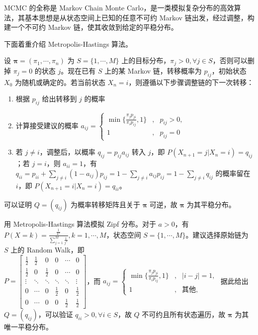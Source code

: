 \documentclass[../main.tex]{subfiles}
\begin{document}
MCMC 的全称是 Markov Chain Monte Carlo，是一类模拟复杂分布的高效算法，其基本思想是从状态空间上已知的任意不可约 Markov 链出发，经过调整，构建一个不可约 Markov 链，使其收敛到给定的平稳分布。

下面着重介绍 Metropolis-Hastings 算法。

设 $\boldsymbol\pi=(\pi_1,\cdots,\pi_n)$ 为 $S=\{1,\cdots,M\}$ 上的目标分布，$\pi_j>0,\forall j\in S$，否则可以删掉 $\pi_j=0$ 的状态 $j$。现在已有 $S$ 上的某 Markov 链，转移概率为 $p_{ij}$，初始状态 $X_0$ 为随机或确定的。若当前状态 $X_n=i$，则遵循以下步骤调整链的下一次转移：
\begin{enumerate}
    \item 根据 $p_{ij}$ 给出转移到 $j$ 的概率
    \item 计算接受建议的概率 $a_{ij}=
              \left\{\begin{aligned}
                  \min\{\frac{\pi_jp_{ji}}{\pi_ip_{ij}},1\} & , & p_{ij}>0, \\
                  1                                         & , & p_{ij}=0
              \end{aligned}\right.$
    \item 若 $j\neq i$，调整后，以概率 $q_{ij}=p_{ij}a_{ij}$ 转入 $j$，即 $P(X_{n+1}=j|X_n=i)=q_{ij}$；若 $j=i$，则 $a_{ii}=1$，有 $q_{ii}=p_{ii}+\sum_{j\neq i}(1-a_{ij})p_{ij}=1-\sum_{j\neq i}a_{ij}p_{ij}=1-\sum_{j\neq i}q_{ij}$ 的概率留在 $i$，即 $P(X_{n+1}=i|X_n=i)=q_{ii}$。
\end{enumerate}
可以证明 $Q=(q_{ij})$ 为概率转移矩阵且关于 $\boldsymbol\pi$ 可逆，故 $\boldsymbol\pi$ 为其平稳分布。

\begin{example}
    用 Metropolis-Hastings 算法模拟 Zipf 分布。对于 $a>0$，有 $P(X=k)=\frac{\frac1{k^a}}{\sum_{j=1}^M\frac1{j^a}},k=1,\cdots,M$，状态空间 $S=\{1,\cdots,M\}$。建议选择原始链为 $S$ 上的 Random Walk，即\\
    $P=\left[\begin{matrix}
                \frac12 & \frac12 & 0       & 0       & \cdots  & 0       \\
                \frac12 & 0       & \frac12 & 0       & \cdots  & 0       \\
                \vdots  & \ddots  & \ddots  & \ddots  & \ddots  & \vdots  \\
                0       & \cdots  & 0       & \frac12 & 0       & \frac12 \\
                0       & \cdots  & 0       & 0       & \frac12 & \frac12
            \end{matrix}\right]$，而 $a_{ij}=
        \left\{\begin{aligned}
            \min\{\frac{\pi_jp_{ji}}{\pi_ip_{ij}},1\} & , & |i-j|=1,     \\
            1                                         & , & \text{其他},
        \end{aligned}\right.$
    据此给出 $Q=(q_{ij})$，可以验证 $q_{ii}>0,\forall i\in S$，故 $Q$ 不可约且所有状态遍历，故 $\boldsymbol\pi$ 为其唯一平稳分布。\\
\end{example}
\end{document}
